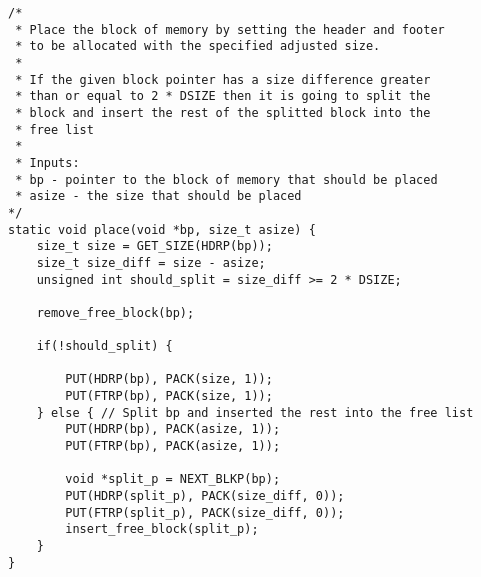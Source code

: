 \begin{lstlisting}
/*
 * Place the block of memory by setting the header and footer
 * to be allocated with the specified adjusted size.
 * 
 * If the given block pointer has a size difference greater 
 * than or equal to 2 * DSIZE then it is going to split the
 * block and insert the rest of the splitted block into the 
 * free list
 * 
 * Inputs:
 * bp - pointer to the block of memory that should be placed
 * asize - the size that should be placed
*/
static void place(void *bp, size_t asize) {
    size_t size = GET_SIZE(HDRP(bp));
    size_t size_diff = size - asize;
    unsigned int should_split = size_diff >= 2 * DSIZE;
    
    remove_free_block(bp);

    if(!should_split) {

        PUT(HDRP(bp), PACK(size, 1));
        PUT(FTRP(bp), PACK(size, 1)); 
    } else { // Split bp and inserted the rest into the free list
        PUT(HDRP(bp), PACK(asize, 1));
        PUT(FTRP(bp), PACK(asize, 1));

        void *split_p = NEXT_BLKP(bp);
        PUT(HDRP(split_p), PACK(size_diff, 0));
        PUT(FTRP(split_p), PACK(size_diff, 0));
        insert_free_block(split_p);
    }
}

\end{lstlisting}